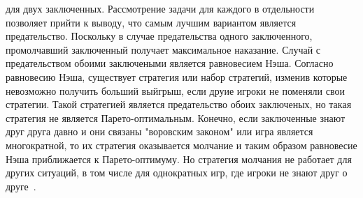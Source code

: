 для двух заключенных. Рассмотрение задачи для каждого в отдельности позволяет прийти к выводу, что
самым лучшим вариантом является предательство. Поскольку в случае предательства одного заключенного,
промолчавший заключенный получает максимальное наказание. Случай с предательством обоими заключеными
является равновесием Нэша. Согласно равновесию Нэша, существует стратегия или набор стратегий,
изменив которые невозможно получить больший выйгрыш, если друие игроки не поменяли свои стратегии.
Такой стратегией является предательство обоих заключеных, но такая стратегия не является Парето-оптимальным.
Конечно, если заключенные знают друг друга давно и они связаны "воровским законом" или игра является
многократной, то их стратегия оказывается молчание и таким образом равновесие Нэша приближается к
Парето-оптимуму. Но стратегия молчания не работает для других ситуаций, в том числе для однократных
игр, где игроки не знают друг о друге~\citep{kreps1982rational}.

